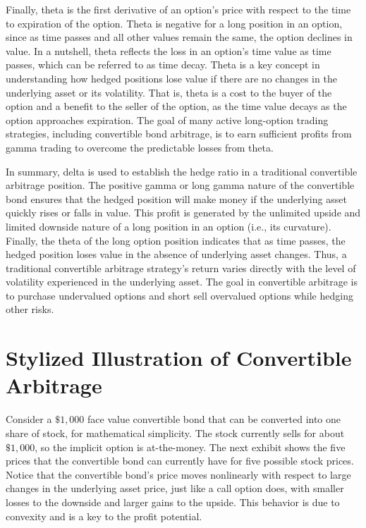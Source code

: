 \documentclass[11pt]{article}
\begin{document}
Finally, theta is the first derivative of an option's price with respect to the time to expiration of the option. Theta is negative for a long position in an option, since as time passes and all other values remain the same, the option declines in value. In a nutshell, theta reflects the loss in an option's time value as time passes, which can be referred to as time decay. Theta is a key concept in understanding how hedged positions lose value if there are no changes in the underlying asset or its volatility. That is, theta is a cost to the buyer of the option and a benefit to the seller of the option, as the time value decays as the option approaches expiration. The goal of many active long-option trading strategies, including convertible bond arbitrage, is to earn sufficient profits from gamma trading to overcome the predictable losses from theta.

In summary, delta is used to establish the hedge ratio in a traditional convertible arbitrage position. The positive gamma or long gamma nature of the convertible bond ensures that the hedged position will make money if the underlying asset quickly rises or falls in value. This profit is generated by the unlimited upside and limited downside nature of a long position in an option (i.e., its curvature). Finally, the theta of the long option position indicates that as time passes, the hedged position loses value in the absence of underlying asset changes. Thus, a traditional convertible arbitrage strategy's return varies directly with the level of volatility experienced in the underlying asset. The goal in convertible arbitrage is to purchase undervalued options and short sell overvalued options while hedging other risks.

\section*{Stylized Illustration of Convertible Arbitrage}
Consider a $\$ 1,000$ face value convertible bond that can be converted into one share of stock, for mathematical simplicity. The stock currently sells for about $\$ 1,000$, so the implicit option is at-the-money. The next exhibit shows the five prices that the convertible bond can currently have for five possible stock prices. Notice that the convertible bond's price moves nonlinearly with respect to large changes in the underlying asset price, just like a call option does, with smaller losses to the downside and larger gains to the upside. This behavior is due to convexity and is a key to the profit potential.
\end{document}
